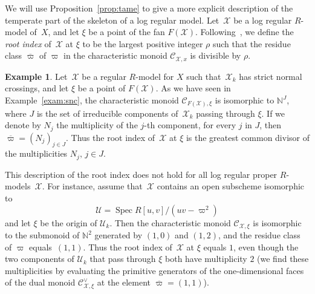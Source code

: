 \documentclass[JEP,XML,SOM,Unicode,NoFloatCountersInSection]{cedram}
\let\mathcal\mathscr
\theoremstyle{definition}
\newtheorem{example}[equation]{Example}
\numberwithin{equation}{subsection}
\newcommand{\N}{\ensuremath{\mathbb{N}}}
\newcommand{\cX}{\ensuremath{\mathscr{X}}}
\newcommand{\cU}{\ensuremath{\mathscr{U}}}
\DeclareMathOperator{\Spec}{Spec}
\let\unif\varpi
\begin{document}
We will use Proposition~\ref{prop:tame} to give a more explicit description of the temperate part of the skeleton of a log regular model.
Let~$\cX$ be a log regular $R$\nobreakdash-model of~$X$, and let $\xi$ be a point of the fan $F(\cX)$. Following~\cite{logzeta}, we define the {\em root index} of~$\cX$ at $\xi$ to be the largest positive integer $\rho$ such that the residue class $\overline{\unif}$ of $\unif$
in the characteristic monoid $\mathcal{C}_{\cX,x}$ is divisible by $\rho$.

\begin{example}
Let~$\cX$ be a regular $R$\nobreakdash-model for $X$ such that~$\cX_k$ has strict normal crossings, and let $\xi$ be a point of $F(\cX)$.
As we have seen in Example~\ref{exam:snc}, the characteristic monoid $\mathcal{C}_{F(\cX),\xi}$ is isomorphic to $\N^J$, where $J$ is the set of irreducible components of~$\cX_k$ passing through $\xi$. If we denote by $N_j$ the multiplicity of the $j$-th component, for every $j$ in $J$, then $\overline{\unif}=(N_j)_{j\in J}$.
Thus the root index of~$\cX$ at $\xi$ is the greatest common divisor of the multiplicities $N_j,\,j\in J$.

This description of the root index does not hold for all log regular proper $R$\nobreakdash-models~$\cX$. For instance, assume that~$\cX$ contains an open subscheme isomorphic to
\[
\cU=\Spec R[u,v]/(uv-\varpi^2)
\]
and let $\xi$ be the origin of $\cU_k$.
Then the characteristic monoid
$\mathcal{C}_{\cX,\xi}$ is isomorphic to the submonoid of $\N^2$ generated by $(1,0)$ and $(1,2)$, and the residue class of $\unif$ equals~$(1,1)$. Thus the root index of~$\cX$ at $\xi$ equals $1$, even though the two components of $\cU_k$ that pass through $\xi$ both have multiplicity $2$ (we find these multiplicities by evaluating the primitive generators of the one-dimensional faces of the dual monoid $\mathcal{C}^{\vee}_{\cX,\xi}$ at the element $\overline{\unif}=(1,1)$).
\end{example}
\end{document}

